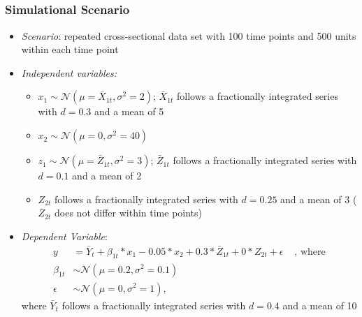 \documentclass{beamer}\usepackage[]{graphicx}\usepackage[]{color}
\begin{document}
\subsection{}
\begin{frame}%
\frametitle{Simulational Scenario}


\begin{itemize}
\item \emph{Scenario}: repeated cross-sectional data set with 100 time points and 500 units within each time point
\item \emph{Independent variables:}
\begin{itemize}
\item $x_1 \sim \mathcal{N}(\mu=\bar{X}_{1t},\sigma^2=2)$; $\bar{X}_{1t}$ follows a fractionally integrated series with $d=0.3$ and a mean of 5
\item $x_2 \sim \mathcal{N}(\mu=0,\sigma^2=40)$
\item $z_1 \sim \mathcal{N}(\mu=\bar{Z}_{1t},\sigma^2=3)$; $\bar{Z}_{1t}$ follows a fractionally integrated series with $d=0.1$ and a mean of 2
\item $Z_{2t}$ follows a fractionally integrated series with $d=0.25$ and a mean of 3 ($Z_{2t}$ does not differ within time points)
\end{itemize}
\item \emph{Dependent Variable}:
\begin{align*}
y &=\bar{Y}_t+\beta_{1t} * x_1 - 0.05 * x_2 + 0.3 * \bar{Z}_{1t} + 0 * Z_{2t} + \epsilon &\text{ , where} \nonumber \\
\beta_{1t} &\sim \mathcal{N}(\mu=0.2,\sigma^2=0.1) & \nonumber \\
\epsilon &\sim \mathcal{N}(\mu=0,\sigma^2=1), &
\end{align*}
\footnotesize{where $\bar{Y}_t$ follows a fractionally integrated series with $d=0.4$ and a mean of 10}
\end{itemize}
\end{frame}
\end{document}
